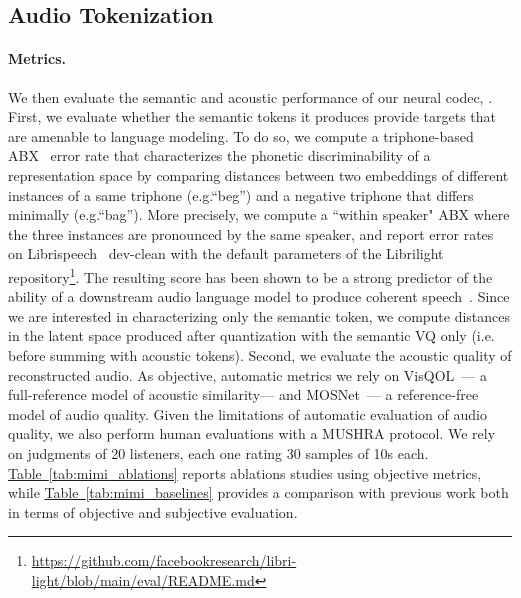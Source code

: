 \subsection{Audio Tokenization}
\label{sec:mimi_eval}

\paragraph{Metrics.}
We then evaluate the semantic and acoustic performance of our neural codec, \mimi. First, we evaluate whether the semantic tokens it produces provide targets that are amenable to language modeling. To do so, we compute a triphone-based ABX~\citep{abx} error rate that characterizes the phonetic discriminability of a representation space by comparing distances between two embeddings of different instances of a same triphone (e.g.``beg'') and a negative triphone that differs minimally (e.g.``bag''). More precisely, we compute a ``within speaker" ABX where the three instances are pronounced by the same speaker, and report error rates on Librispeech~\citep{librispeech} dev-clean with the default parameters of the Librilight \citep{librilight} repository\footnote{\url{https://github.com/facebookresearch/libri-light/blob/main/eval/README.md}}. The resulting score has been shown to be a strong predictor of the ability of a downstream audio language model to produce coherent speech~\citep{gslm}. Since we are interested in characterizing only the semantic token, we compute distances in the latent space produced after quantization with the semantic VQ only (i.e. before summing with acoustic tokens). 
Second, we evaluate the acoustic quality of reconstructed audio. As objective, automatic metrics we rely on VisQOL~\citep{hines2015visqol}--- a full-reference model of acoustic similarity--- and MOSNet~\citep{mosnet}--- a reference-free model of audio quality. Given the limitations of automatic evaluation of audio quality, we also perform human evaluations with a MUSHRA protocol. We rely on judgments of 20 listeners, each one rating 30 samples of 10s each. \hyperref[tab:mimi_ablations]{Table~\ref{tab:mimi_ablations}} reports ablations studies using objective metrics, while \hyperref[tab:mimi_baselines]{Table~\ref{tab:mimi_baselines}} provides a comparison with previous work both in terms of objective and subjective evaluation.

